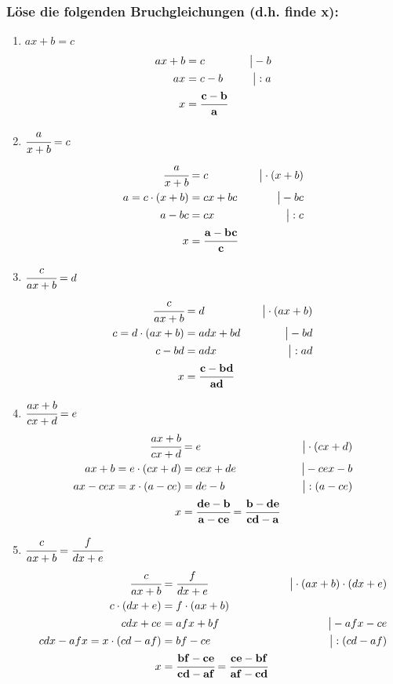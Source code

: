 \documentclass[a4paper,10pt]{article} %
\begin{document}
\subsubsection{Löse die folgenden Bruchgleichungen (d.h. finde x):}

\begin{enumerate}[label=\alph*)]

  \item \(ax + b = c\)
  \[
    \begin{aligned}
      ax + b &= c &\quad\big| - b \\
      ax &= c - b &\quad\big| : a \\
      x &= \mathbf{\cfrac{c - b}{a}}
    \end{aligned}
  \]

  \item \(\cfrac{a}{x + b} = c\)
  \[
    \begin{aligned}
      \cfrac{a}{x + b} &= c &\quad\big| \cdot (x + b) \\
      a = c \cdot (x + b) &= cx + bc &\quad\big| - bc \\
      a - bc &= cx &\quad\big| : c \\
      x &= \mathbf{\cfrac{a - bc}{c}}
    \end{aligned}
  \]

  \item \(\cfrac{c}{ax + b} = d\)
  \[
    \begin{aligned}
      \cfrac{c}{ax + b} &= d &\quad\big| \cdot (ax + b) \\
      c = d \cdot (ax + b) &= adx + bd &\quad\big| - bd \\
      c - bd &= adx &\quad\big| : ad \\
      x &= \mathbf{\cfrac{c - bd}{ad}}
    \end{aligned}
  \]

  \item \(\cfrac{ax + b}{cx + d} = e\)
  \[
    \begin{aligned}
      \cfrac{ax + b}{cx + d} &= e &\quad\big| \cdot (cx + d) \\
      ax + b = e \cdot (cx + d) &= cex + de &\quad\big| - cex - b \\
      ax - cex = x \cdot (a - ce) &= de - b &\quad\big| : (a - ce) \\
      x &= \mathbf{\cfrac{de - b}{a - ce}} = \mathbf{\cfrac{b - de}{cd - a}}
    \end{aligned}
  \]

  \item \(\cfrac{c}{ax + b} = \cfrac{f}{dx + e}\)
  \[
    \begin{aligned}
      \cfrac{c}{ax + b} &= \cfrac{f}{dx + e} &\quad\big| \cdot (ax + b) \cdot (dx + e) \\
      c \cdot (dx + e) &= f \cdot (ax + b) \\
      cdx + ce &= afx + bf &\quad\big| - afx - ce \\
      cdx - afx = x \cdot (cd - af) &= bf -ce &\quad\big| : (cd - af) \\
      x &= \mathbf{\cfrac{bf - ce}{cd - af}} = \mathbf{\cfrac{ce - bf}{af - cd}}
    \end{aligned}
  \]


\end{enumerate}
\end{document}
